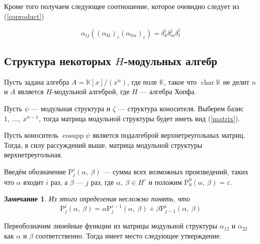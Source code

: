 \documentclass[12pt, reqno, a4paper, oneside, notitlepage]{amsart}
\theoremstyle{mytheoremstyle}
\theoremstyle{myremarkstyle}
\newtheorem{remark}[theorem]{Замечание}
\numberwithin{equation}{section}
\DeclareMathOperator{\chr}{char}
\DeclareMathOperator{\cosupp}{cosupp}
\begin{document}
Кроме того получаем следующее соотношение, которое очевидно следует из (\ref{coproduct})

\begin{equation}\label{pods}
  \alpha_{ij}\left((\alpha_{kl})_\varepsilon(\alpha_{tm})_\varepsilon\right) = \delta^i_k\delta^j_m\delta^l_t
\end{equation}

\newpage

\subsection{Структура некоторых \texorpdfstring{$H$}{H}-модульных алгебр}

Пусть задана алгебра $A = \mathbb{K}[x]/(x^n)$, где поле $\mathbb{K}$, такое что $\chr \mathbb{K}$  не делит $n$ и $A$ является $H$-модульной алгеброй, где $H$ --- алгебра Хопфа.

Пусть $\psi$ --- модульная структура и $\zeta$ --- структура коносителя.
Выберем базис $1,\ \dots,\ x^{n-1}$, тогда матрица модульной структуры будет иметь вид (\ref{matrix}).

Пусть коноситель $\cosupp \psi$ является подалгеброй верхнетреугольных матриц. Тогда, в силу рассуждений выше, матрица модульной структуры верхнетреугольная.

Введём обозначение $\mathrm{P}^i_j(\alpha,\ \beta)$ --- сумма всех возможных произведений, таких что $\alpha$  входит $i$ раз, а $\beta$ --- $j$ раз, где $\alpha,\ \beta \in H^\circ$ и положим $\mathrm{P}^0_0(\alpha,\ \beta) = \varepsilon$.

\begin{remark} \label{reqursive}
  Из этого определения несложно понять, что
  \[
	\mathrm{P}^i_j(\alpha,\ \beta) = \alpha\mathrm{P}^{i-1}_j(\alpha,\ \beta)+\beta\mathrm{P}^i_{j-1}(\alpha,\ \beta)
  \]
\end{remark}

Переобозначим линейные функции из матрицы модульной структуры $\alpha_{12}$ и $\alpha_{22}$ как $\alpha$ и $\beta$ соответственно.
Тогда имеет место следующее утверждение.
\end{document}
